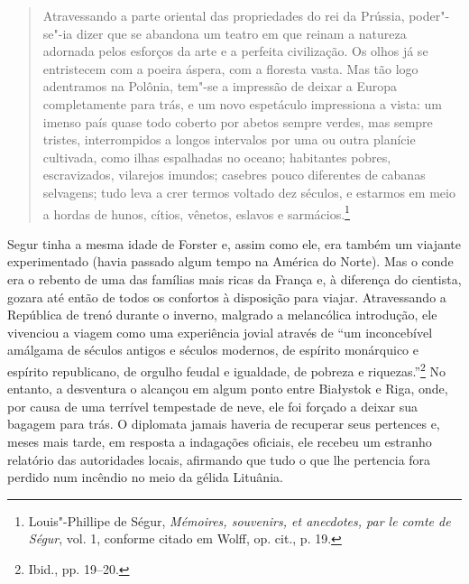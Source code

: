 \begin{quote}
Atravessando a parte oriental das propriedades do rei da Prússia,
poder"-se"-ia dizer que se abandona um teatro em que reinam a natureza
adornada pelos esforços da arte e a perfeita civilização. Os olhos já se
entristecem com a poeira áspera, com a floresta vasta. Mas tão logo
adentramos na Polônia, tem"-se a impressão de deixar a Europa
completamente para trás, e um novo espetáculo impressiona a vista: um
imenso país quase todo coberto por abetos sempre verdes, mas sempre
tristes, interrompidos a longos intervalos por uma ou outra planície
cultivada, como ilhas espalhadas no oceano; habitantes pobres,
escravizados, vilarejos imundos; casebres pouco diferentes de cabanas
selvagens; tudo leva a crer termos voltado dez séculos, e estarmos em
meio a hordas de hunos, cítios, vênetos, eslavos e sarmácios.\footnote{Louis"-Phillipe de Ségur, \textit{Mémoires, souvenirs, et anecdotes, par le comte de Ségur}, vol. 1, conforme citado em Wolff, op. cit., p. 19.} \end{quote}


\asterisc

Segur tinha a mesma idade de Forster e, assim como ele, era também um
viajante experimentado (havia passado algum tempo na América do Norte).
Mas o conde era o rebento de uma das famílias mais ricas da França e, à
diferença do cientista, gozara até então de todos os confortos à
disposição para viajar. Atravessando a República de trenó durante o
inverno, malgrado a melancólica introdução, ele vivenciou a viagem como
uma experiência jovial através de ``um inconcebível amálgama de séculos
antigos e séculos modernos, de espírito monárquico e espírito
republicano, de orgulho feudal e igualdade, de pobreza e
riquezas.''\footnote{Ibid., pp. 19--20.} No entanto, a desventura o
alcançou em algum ponto entre Białystok e Riga, onde, por causa de uma
terrível tempestade de neve, ele foi forçado a deixar sua bagagem para
trás. O diplomata jamais haveria de recuperar seus pertences e, meses
mais tarde, em resposta a indagações oficiais, ele recebeu um estranho
relatório das autoridades locais, afirmando que tudo o que lhe pertencia
fora perdido num incêndio no meio da gélida Lituânia.

